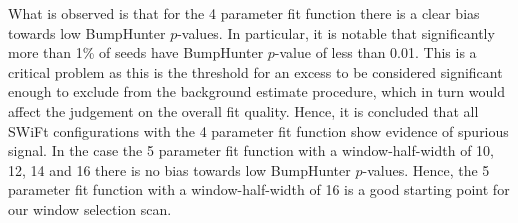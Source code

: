 What is observed is that for the 4 parameter fit function  there is a clear bias towards
low {\sc BumpHunter} $p$-values. In particular, it is notable that significantly more than 1\% of seeds have {\sc BumpHunter} $p$-value of less than 0.01.
This is a critical problem as this is the threshold for an excess
to be considered significant enough to exclude from the background estimate procedure,
which in turn would affect the judgement on the overall fit quality.
Hence, it is concluded that all SWiFt configurations with the 4 parameter fit function show evidence of spurious signal.
In the case the 5 parameter fit function
with a window-half-width of 10, 12, 14 and 16 there is no bias towards low {\sc BumpHunter} $p$-values.
Hence, the 5 parameter fit function with a window-half-width of 16 is a good starting point for our window selection scan.



